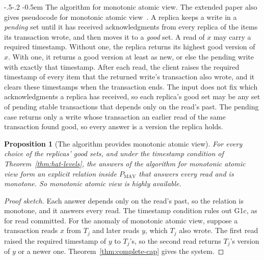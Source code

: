 \documentclass[sigconf]{cidr-2027}
\makeatletter
\newtheorem{proposition}{Proposition}
\theoremstyle{remark}
\renewcommand\paragraph{\@startsection{paragraph}{4}{\z@}%
  {-.5\baselineskip \@plus -2\p@ \@minus -.2\p@}%
  {-0.5em}%
  {\normalfont\bfseries}}
\makeatother
\begin{document}
\paragraph{The algorithm for monotonic atomic view.}
The extended paper also gives pseudocode for monotonic atomic
view~\cite[App.~B]{bailis2013hatextended}. A replica keeps a write in a
\emph{pending} set until it has received acknowledgments from every replica of
the items its transaction wrote, and then moves it to a \emph{good} set. A
read of $x$ may carry a required timestamp. Without one, the replica returns
its highest good version of $x$. With one, it returns a good version at least
as new, or else the pending write with exactly that timestamp. After each
read, the client raises the required timestamp of every item that the
returned write's transaction also wrote, and it clears these timestamps when
the transaction ends. The input does not fix which acknowledgments a
replica has received, so each replica's good set may be any set of pending
stable transactions that depends only on the read's past. The pending case
returns only a write whose transaction an earlier read of the same transaction
found good, so every answer is a version the replica holds.

\begin{proposition}[The algorithm provides monotonic atomic view]
\label{prop:hat-mav-algorithm}
For every choice of the replicas' good sets, and under the timestamp condition
of Theorem~\ref{thm:hat-levels}, the answers of the algorithm for monotonic
atomic view form an explicit relation inside $P_{\mathrm{MAV}}$ that answers
every read and is monotone. So monotonic atomic view is highly available.
\end{proposition}

\begin{proof}[Proof sketch]
Each answer depends only on the read's past, so the relation is monotone, and
it answers every read. The timestamp condition rules out G1c, as for read
committed. For the anomaly of monotonic atomic view, suppose a transaction
reads $x$ from $T_j$ and later reads $y$, which $T_j$ also wrote. The first
read raised the required timestamp of $y$ to $T_j$'s, so the second read
returns $T_j$'s version of $y$ or a newer one. Theorem~\ref{thm:complete-cap}
gives the system.
\end{proof}
\end{document}
